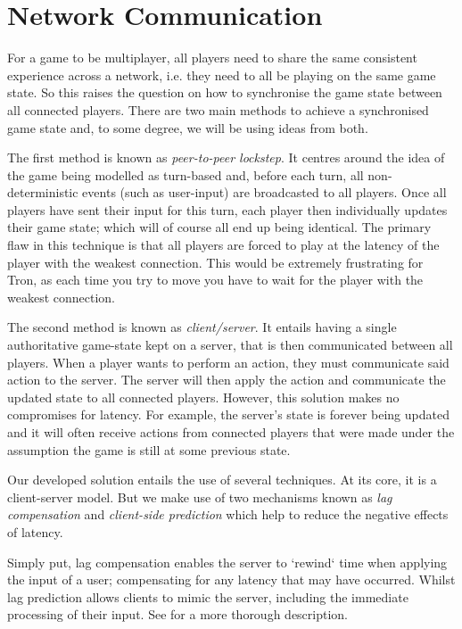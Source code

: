 \documentclass{standalone}
\begin{document}
	\section{Network Communication}
		For a game to be multiplayer, all players need to share the same consistent experience across a network, i.e. they need to all be playing on the same game state. So this raises the question on how to synchronise the game state between all connected players. There are two main methods to achieve a synchronised game state and, to some degree, we will be using ideas from both.

		The first method is known as \emph{peer-to-peer lockstep}. It centres around the idea of the game being modelled as turn-based and, before each turn, all non-deterministic events (such as user-input) are broadcasted to all players. Once all players have sent their input for this turn, each player then individually updates their game state; which will of course all end up being identical. The primary flaw in this technique is that all players are forced to play at the latency of the player with the weakest connection. This would be extremely frustrating for Tron, as each time you try to move you have to wait for the player with the weakest connection.

		The second method is known as \emph{client/server}. It entails having a single authoritative game-state kept on a server, that is then communicated between all players. When a player wants to perform an action, they must communicate said action to the server. The server will then apply the action and communicate the updated state to all connected players. However, this solution makes no compromises for latency. For example, the server's state is forever being updated and it will often receive actions from connected players that were made under the assumption the game is still at some previous state.

		Our developed solution entails the use of several techniques. At its core, it is a client-server model. But we make use of two mechanisms known as \emph{lag compensation}\parencite{LagCompensation} and \emph{client-side prediction}\parencite{LagPrediction} which help to reduce the negative effects of latency.

		Simply put, lag compensation enables the server to `rewind` time when applying the input of a user; compensating for any latency that may have occurred. Whilst lag prediction allows clients to mimic the server, including the immediate processing of their input. See \parencite{LatencyCompensating} for a more thorough description.
\end{document}
